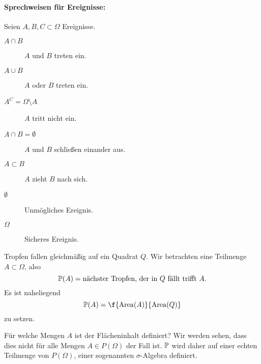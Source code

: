\paragraph{Sprechweisen für Ereignisse:}
Seien $A, B, C \subset \Omega$ Ereignisse.
\begin{description}
	\item[$A \cap B$]
		$A$ und $B$ treten ein.
	\item[$A \cup B$]
		$A$ oder $B$ treten ein.
	\item[$A^C = \Omega \setminus A$]
		$A$ tritt nicht ein.
	\item[$A \cap B = \emptyset$]
		$A$ und $B$ schließen einander aus.
	\item[$A \subset B$]
		$A$ zieht $B$ nach sich.
	\item[$\emptyset$]
		Unmögliches Ereignis.
	\item[$\Omega$]
		Sicheres Ereignis.
\end{description}

\begin{ex} \label{0.2.6}
	Tropfen fallen gleichmäßig auf ein Quadrat $Q$.
	Wir betrachten eine Teilmenge $A \subset \Omega$, also
	\[
		\P(A) = \text{nächster Tropfen, der in $Q$ fällt trifft $A$}.
	\]
	Es ist naheliegend
	\[
		\P(A)
		= \f {\Area(A)}{\Area(Q)}
	\]
	zu setzen.

	Für welche Mengen $A$ ist der Flächeninhalt definiert?
	Wir werden sehen, dass dies nicht für alle Mengen $A \in P(\Omega)$ der Fall ist.
	$\P$ wird daher auf einer echten Teilmenge von $P(\Omega)$, einer sogenannten $\sigma$-Algebra definiert.
\end{ex}

